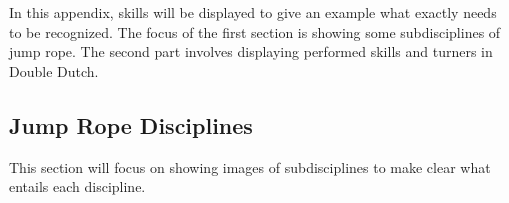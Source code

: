 \chapter{}%
\label{ch:skills and turners}


In this appendix, skills will be displayed to give an example what exactly needs to be recognized. The focus of the first section is showing some subdisciplines of jump rope. The second part involves displaying performed skills and turners in Double Dutch.

\section{Jump Rope Disciplines}
\label{subsubsec:jump-rope-disciplines}

This section will focus on showing images of subdisciplines to make clear what entails each discipline.


